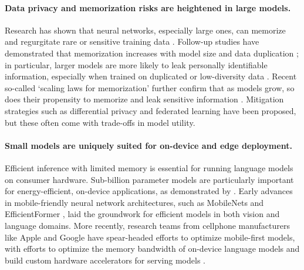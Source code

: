 
\paragraph{Data privacy and memorization risks are heightened in large models.} Research has shown that neural networks, especially large ones, can memorize and regurgitate rare or sensitive training data \citep{feldman2020neural, carlini2019secret}. Follow-up studies have demonstrated that memorization increases with model size and data duplication \citep{carlini2021extracting, carlini2022quantifying}; in particular, larger models are more likely to leak personally identifiable information, especially when trained on duplicated or low-diversity data \citep{huang2022large, neel2023privacy}. Recent so-called `scaling laws for memorization' further confirm that as models grow, so does their propensity to memorize and leak sensitive information \citep{lu2024scaling, biderman2023emergent, kiyomaru2024comprehensive}. Mitigation strategies such as differential privacy \citep{dwork2006calibrating} and federated learning \citep{mcmahan2017communication} have been proposed, but these often come with trade-offs in model utility.%

\paragraph{Small models are uniquely suited for on-device and edge deployment.} Efficient inference with limited memory is essential for running language models on consumer hardware. Sub-billion parameter models are particularly important for energy-efficient, on-device applications, as demonstrated by \citet{liu2024mobilellm}. Early advances in mobile-friendly neural network architectures, such as MobileNets \citep{howard2017mobilenets} and EfficientFormer \citep{li2022efficientformer}, laid the groundwork for efficient models in both vision and language domains. More recently, research teams from cellphone manufacturers like Apple and Google have spear-headed efforts to optimize mobile-first models, with efforts to optimize the memory bandwidth of on-device language models \citep{alizadeh2024llm} and build custom hardware accelerators for serving models \citep{deepmind2023gemini}. %
 

